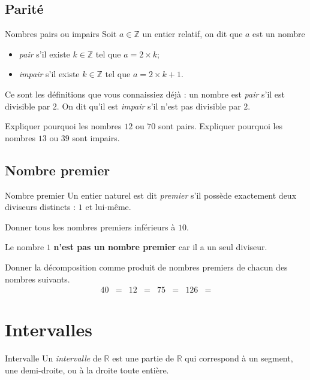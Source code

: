 \documentclass[11pt]{article}
\begin{document}
\subsection{Parité}
\begin{defi}{Nombres pairs ou impairs}
  Soit $a\in\mathbb{Z}$ un entier relatif, on dit que $a$ est un nombre
  \begin{itemize}
    \item \emph{pair} s'il existe $k\in\mathbb{Z}$ tel que $a=2\times k$;
    \item \emph{impair} s'il existe $k\in\mathbb{Z}$ tel que $a=2\times k+1$.
  \end{itemize}
\end{defi}
\begin{rmq}
  Ce sont les définitions que vous connaissiez déjà : un nombre est
  \emph{pair} s'il est divisible par $2$. On dit qu'il est \emph{impair} s'il
  n'est pas divisible par $2$.
\end{rmq}
\begin{exemple}
  Expliquer pourquoi les nombres $12$ ou $70$ sont pairs. Expliquer pourquoi les
  nombres $13$ ou $39$ sont impairs.
\end{exemple}
\subsection{Nombre premier}
\begin{defi}{Nombre premier}
  Un entier naturel est dit \emph{premier} s'il possède exactement deux
  diviseurs distincts : $1$ et lui-même.
\end{defi}
\begin{exemple}
  Donner tous kes nombres premiers inférieurs à $10$.
\end{exemple}
\begin{rmq}
  Le nombre $1$ \textbf{n'est pas un nombre premier} car il a un seul diviseur.
\end{rmq}
\begin{exemple}
  Donner la décomposition comme produit de nombres premiers de chacun des
  nombres suivants.
  \begin{align*}
    40 &= &
    12 &= &
    75 &= &
    126 &=
  \end{align*}
\end{exemple}

\section{Intervalles}
\begin{defi}{Intervalle}
  Un \emph{intervalle} de $\mathbb{R}$ est une partie de $\mathbb{R}$ qui
  correspond à un segment, une demi-droite, ou à la droite toute entière.  
\end{defi}
\end{document}
